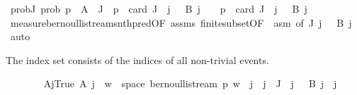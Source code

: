 \begin{isabellebody}
\ prob{\isacharunderscore}{\kern0pt}J{\isacharprime}{\kern0pt}{\isacharcolon}{\kern0pt}\ {\isachardoublequoteopen}prob\ p\ {\isacharparenleft}{\kern0pt}{\isasymInter}\ {\isacharparenleft}{\kern0pt}A\ {\isacharbackquote}{\kern0pt}\ J{\isacharprime}{\kern0pt}{\isacharparenright}{\kern0pt}{\isacharparenright}{\kern0pt}\ {\isacharequal}{\kern0pt}\ p\ {\isacharcircum}{\kern0pt}\ card\ {\isacharparenleft}{\kern0pt}J{\isacharprime}{\kern0pt}\ {\isasyminter}\ {\isacharbraceleft}{\kern0pt}j{\isachardot}{\kern0pt}\ {}\ {\isasymin}\ B\ j{\isacharbraceright}{\kern0pt}{\isacharparenright}{\kern0pt}\ {\isacharasterisk}{\kern0pt}\ {\isacharparenleft}{\kern0pt}{}\ {\isacharminus}{\kern0pt}\ p{\isacharparenright}{\kern0pt}\ {\isacharcircum}{\kern0pt}\ card\ {\isacharparenleft}{\kern0pt}J{\isacharprime}{\kern0pt}\ {\isacharminus}{\kern0pt}\ {\isacharbraceleft}{\kern0pt}j{\isachardot}{\kern0pt}\ {}\ {\isasymin}\ B\ j{\isacharbraceright}{\kern0pt}{\isacharparenright}{\kern0pt}{\isachardoublequoteclose}\ \isanewline
\ \ \ \ \ \ \ \ \isamarkupfalse%
\ measure{\isacharunderscore}{\kern0pt}bernoulli{\isacharunderscore}{\kern0pt}stream{\isacharunderscore}{\kern0pt}snth{\isacharunderscore}{\kern0pt}pred{\isacharbrackleft}{\kern0pt}OF\ assms\ finite{\isacharunderscore}{\kern0pt}subset{\isacharbrackleft}{\kern0pt}OF\ {\isacharunderscore}{\kern0pt}\ asm{\isacharparenleft}{\kern0pt}{}{\isacharparenright}{\kern0pt}{\isacharbrackright}{\kern0pt}{\isacharcomma}{\kern0pt}\ of\ J{\isacharprime}{\kern0pt}\ {\isachardoublequoteopen}{\isasymlambda}j{\isachardot}{\kern0pt}\ {}\ {\isasymin}\ B\ j{\isachardoublequoteclose}{\isacharbrackright}{\kern0pt}\ \isamarkupfalse%
\ auto%
\begin{isamarkuptext}%
The index set  consists of the indices of all non-trivial events.%
\end{isamarkuptext}\isamarkuptrue%
\ \ \ \ \ \ \isamarkupfalse%
\ A{\isacharunderscore}{\kern0pt}j{\isacharunderscore}{\kern0pt}True{\isacharcolon}{\kern0pt}\ {\isachardoublequoteopen}A\ j\ {\isacharequal}{\kern0pt}\ {\isacharbraceleft}{\kern0pt}w\ {\isasymin}\ space\ {\isacharparenleft}{\kern0pt}bernoulli{\isacharunderscore}{\kern0pt}stream\ p{\isacharparenright}{\kern0pt}{\isachardot}{\kern0pt}\ w\ {\isacharbang}{\kern0pt}{\isacharbang}{\kern0pt}\ j{\isacharbraceright}{\kern0pt}{\isachardoublequoteclose}\ \ {\isachardoublequoteopen}j\ {\isasymin}\ J{\isacharprime}{\kern0pt}\ {\isasyminter}\ {\isacharbraceleft}{\kern0pt}j{\isachardot}{\kern0pt}\ {}\ {\isasymin}\ B\ j{\isacharbraceright}{\kern0pt}{\isachardoublequoteclose}\ \ j\isanewline

\end{isabellebody}
